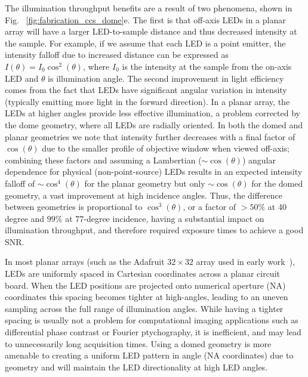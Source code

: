 The illumination throughput benefits are a result of two phenomena, shown in Fig. ~\ref{fig:fabrication_ccs_dome}e. The first is that off-axis LEDs in a planar array will have a larger LED-to-sample distance and thus decreased intensity at the sample. For example, if we assume that each LED is a point emitter, the intensity falloff due to increased distance can be expressed as $I(\theta) = I_0 \cos^2(\theta)$, where $I_0$ is the intensity at the sample from the on-axis LED and $\theta$ is illumination angle. The second improvement in light efficiency comes from the fact that LEDs have significant angular variation in intensity (typically emitting more light in the forward direction). In a planar array, the LEDs at higher angles provide less effective illumination, a problem corrected by the dome geometry, where all LEDs are radially oriented. In both the domed and planar geometries we note that intensity further decreases with a final factor of $\cos(\theta)$ due to the smaller profile of objective window when viewed off-axis; combining these factors and assuming a Lambertian ($\sim\cos(\theta)$) angular dependence for physical (non-point-source) LEDs results in an expected intensity falloff of $\sim\cos^4(\theta)$ for the planar geometry but only $\sim\cos(\theta)$ for the domed geometry, a vast improvement at high incidence angles. Thus, the difference between geometries is proportional to $\cos^{3}(\theta)$, or a factor of $> 50 \%$ at 40 degree and $99\%$ at 77-degree incidence, having a substantial impact on illumination throughput, and therefore required exposure times to achieve a good SNR.

In most planar arrays (such as the Adafruit $32 \times 32$ array used in early work~\cite{Zheng2013, Zheng2011}), LEDs are uniformly spaced in Cartesian coordinates across a planar circuit board. When the LED positions are projected onto numerical aperture (NA) coordinates this spacing becomes tighter at high-angles, leading to an uneven sampling across the full range of illumination angles. While having a tighter spacing is usually not a problem for computational imaging applications such as differential phase contrast or Fourier ptychography, it is inefficient, and may lead to unnecessarily long acquisition times. Using a domed geometry is more amenable to creating a uniform LED pattern in angle (NA coordinates) due to geometry and will maintain the LED directionality at high LED angles.

